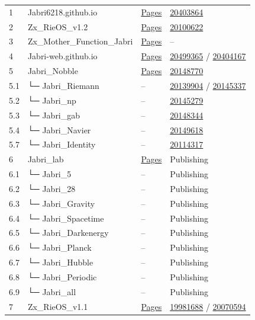 \documentclass[a4paper,11pt]{article}
\begin{document}
\begin{otherlanguage}{english}
\begin{longtable}{>{\raggedright}p{1.2cm} >{\raggedright}p{3.5cm} >{\raggedright}p{3.5cm} >{\raggedright}p{3.5cm}}
1 & Jabri6218.github.io & \href{https://jabri-web.github.io/jabri62018.github.io/}{Pages} & \href{https://doi.org/10.5281/zenodo.20403864}{20403864} \\
2 & Zx\_RieOS\_v1.2 & \href{https://jabri-web.github.io/Zx_RieOS_v1.2/}{Pages} & \href{https://doi.org/10.5281/zenodo.20100622}{20100622} \\
3 & Zx\_Mother\_Function\_Jabri & \href{https://Jabri-web.github.io/Zx_Mother_Function_Jabri/}{Pages} & -- \\
4 & Jabri-web.github.io & \href{https://Jabri-web.github.io/}{Pages} & \href{https://doi.org/10.5281/zenodo.20499365}{20499365} / \href{https://doi.org/10.5281/zenodo.20404167}{20404167} \\
5 & Jabri\_Nobble & \href{https://jabri-web.github.io/Jabri_Nobble/}{Pages} & \href{https://doi.org/10.5281/zenodo.20148770}{20148770} \\
5.1 & └─ Jabri\_Riemann & -- & \href{https://doi.org/10.5281/zenodo.20139904}{20139904} / \href{https://doi.org/10.5281/zenodo.20145337}{20145337} \\
5.2 & └─ Jabri\_np & -- & \href{https://doi.org/10.5281/zenodo.20145279}{20145279} \\
5.3 & └─ Jabri\_gab & -- & \href{https://doi.org/10.5281/zenodo.20148344}{20148344} \\
5.4 & └─ Jabri\_Navier & -- & \href{https://doi.org/10.5281/zenodo.20149618}{20149618} \\
5.7 & └─ Jabri\_Identity & -- & \href{https://doi.org/10.5281/zenodo.20114317}{20114317} \\
6 & Jabri\_lab & \href{https://jabri-web.github.io/jabri_lab/}{Pages} & Publishing \\
6.1 & └─ Jabri\_5 & -- & Publishing \\
6.2 & └─ Jabri\_28 & -- & Publishing \\
6.3 & └─ Jabri\_Gravity & -- & Publishing \\
6.4 & └─ Jabri\_Spacetime & -- & Publishing \\
6.5 & └─ Jabri\_Darkenergy & -- & Publishing \\
6.6 & └─ Jabri\_Planck & -- & Publishing \\
6.7 & └─ Jabri\_Hubble & -- & Publishing \\
6.8 & └─ Jabri\_Periodic & -- & Publishing \\
6.9 & └─ Jabri\_all & -- & Publishing \\
7 & Zx\_RieOS\_v1.1 & \href{https://Jabri-web.github.io/Zx_RieOS_v1.1/}{Pages} & \href{https://doi.org/10.5281/zenodo.19981688}{19981688} / \href{https://doi.org/10.5281/zenodo.20070594}{20070594} \\

\end{longtable}
\end{otherlanguage}
\end{document}
